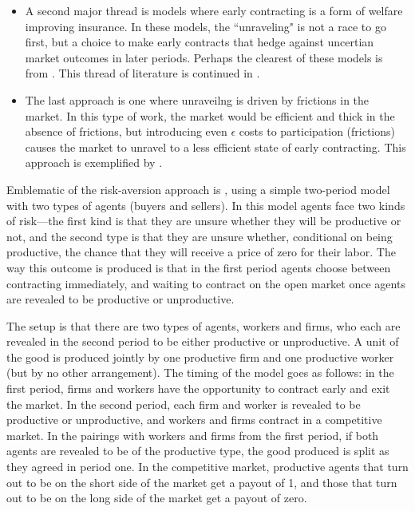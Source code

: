 \documentclass[WP]{AEA}
\begin{document}
\begin{itemize}
	\item  A second major thread is models where early contracting is a form of welfare improving insurance. In these models, the ``unraveling" is not a race to go first, but a choice to make early contracts that hedge against uncertian market outcomes in later periods.  Perhaps the clearest of these models is from \cite{Li1998}. This thread of literature is continued in \cite{Li2000,Li2004}.
	\item The last approach is one where unraveilng is driven by frictions in the market. In this type of work, the market would be efficient and thick in the absence of frictions, but introducing even $\epsilon$ costs to participation (frictions) causes the market to unravel to a less efficient state of early contracting.  This approach is exemplified by \cite{Damiano2005}.
\end{itemize}




Emblematic of the risk-aversion approach is \cite{Li1998}, using a simple two-period model with two types of agents (buyers and sellers).  
In this model agents face two kinds of risk—the first kind is that they are unsure whether they will be productive or not, and the second type is that they are unsure whether, conditional on being productive, the chance that they will receive a price of zero for their labor.  The way this outcome is produced is that in the first period agents choose between contracting immediately, and waiting to contract on the open market once agents are revealed to be productive or unproductive.  

The setup is that there are two types of agents, workers and firms, who each are revealed in the second period to be either productive or unproductive. A unit of the good is produced jointly by one productive firm and one productive worker (but by no other arrangement). The timing of the model goes as follows: in the first period, firms and workers have the opportunity to contract early and exit the market. In the second period, each firm and worker is revealed  to be productive or unproductive, and workers and firms contract in a competitive market.  In the pairings with workers and firms from the first period, if both agents are revealed to be of the productive type, the good produced is split as they agreed in period one. In the competitive market, productive agents that turn out to be on the short side of the market get a payout of 1, and those that turn out to be on the long side of the market get a payout of zero.
\end{document}
